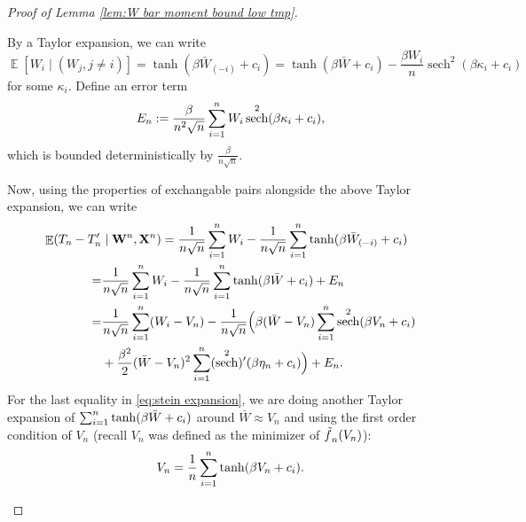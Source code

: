 \documentclass[preprint,reqno]{imsart}
\DeclareMathOperator{\ft}{\tilde{\mathnormal f}}
\DeclareMathOperator{\sech}{sech}
\DeclareMathOperator{\EE}{\mathbb{E}}
\newcommand{\W}{\mathbf{W}}
\newcommand{\X}{\mathbf{X}}
\DeclareMathOperator{\sumin}{\sum_{\mathnormal i=1}^{\mathnormal n}}
\begin{document}
\begin{appendix}
\begin{proof}[Proof of Lemma \ref{lem:W bar moment bound low tmp}]
\begin{enumerate}[(a)]
    By a Taylor expansion, we can write
    $$\EE[W_i \mid (W_j, j \neq i)] = \tanh(\beta \bar{W}_{(-i)} + c_i) = \tanh(\beta \bar{W} + c_i) - \frac{\beta W_i}{n} \sech^2(\beta \kappa_i + c_i)$$
    for some $\kappa_i$. Define an error term
    $$E_n := \frac{\beta}{n^2\sqrt{n}} \sumin W_i \sech^2(\beta \kappa_i + c_i),$$ which is bounded deterministically by $\frac{\beta}{n\sqrt{n}}$.

    Now, using the properties of exchangable pairs alongside the above Taylor expansion, we can write
    \begin{equation}\label{eq:stein expansion}
    \begin{aligned}
        \EE(T_n - T_n' &\mid \W^n, \X^n) = \frac{1}{n\sqrt{n}}\sumin W_i - \frac{1}{n\sqrt{n}} \sumin \tanh(\beta \bar{W}_{(-i)} + c_i) \\
        =& \frac{1}{n\sqrt{n}}\sumin W_i - \frac{1}{n\sqrt{n}} \sumin \tanh(\beta \bar{W} + c_i) + E_n \\
        =& \frac{1}{n\sqrt{n}}\sumin (W_i-V_n) - \frac{1}{n\sqrt{n}} \Big(\beta (\bar{W}-V_n) \sumin \sech^2(\beta V_n + c_i) \\
        &+ \frac{\beta^2}{2}(\bar{W}-V_n)^2 \sumin (\sech^2)'(\beta \eta_n + c_i) \Big) + E_n.
    \end{aligned}
    \end{equation}
    For the last equality in \eqref{eq:stein expansion}, we are doing another Taylor expansion of $\sumin \tanh(\beta \bar{W} + c_i)$ around $\bar{W} \approx V_n$ and using the first order condition of $V_n$ (recall $V_n$ was defined as the minimizer of $\ft_n(V_n)$):
    \begin{align}\label{eq:V_n FOC}
        V_n = \frac{1}{n} \sumin \tanh(\beta V_n + c_i).
    \end{align}



    

\end{enumerate}
\end{proof}
\end{appendix}
\end{document}
